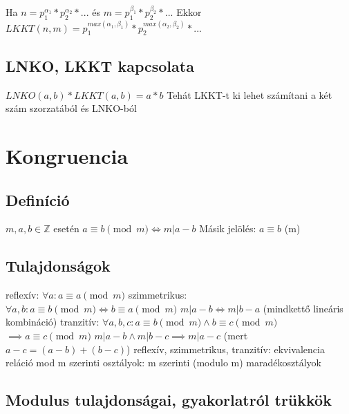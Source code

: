 \documentclass[12pt,a4paper]{article}
\begin{document}
\begin{outline}
	\1 Ha $n=p_1^{\alpha_1}*p_2^{\alpha_2}*...$ és $m=p_1^{\beta_1}*p_2^{\beta_2}*...$
	\1 Ekkor $LKKT(n,m) = p_1^{max(\alpha_1,\beta_1)}*p_2^{max(\alpha_2,\beta_2)}*...$
\end{outline}

\subsection{LNKO, LKKT kapcsolata}

\begin{outline}
	\1 $LNKO(a,b)*LKKT(a,b)=a*b$
	\1 Tehát LKKT-t ki lehet számítani a két szám szorzatából és LNKO-ból
\end{outline}

\pagebreak

\section{Kongruencia}

\subsection{Definíció}

\begin{outline}
	\1 $m,a,b \in \mathbb{Z}$ esetén $a \equiv b \pmod m \Leftrightarrow m|a-b$
	\1 Másik jelölés: $a \equiv b$ (m)
\end{outline}

\subsection{Tulajdonságok}

\begin{outline}
	\1 reflexív: $\forall a: a \equiv a \pmod m$
	\1 szimmetrikus: $\forall a,b: a \equiv b \pmod m \Leftrightarrow b \equiv a \pmod m$
		\2 $m|a-b \Leftrightarrow m|b-a$ (mindkettő lineáris kombináció)
	\1 tranzitív: $\forall a,b,c: a \equiv b \pmod m \wedge b \equiv c \pmod m$\\
	$\implies a \equiv c \pmod m$
		\2 $m|a-b \wedge m|b-c \implies m|a-c$ (mert $a-c=(a-b)+(b-c)$)
	\1 reflexív, szimmetrikus, tranzitív: ekvivalencia reláció
		\2 mod m szerinti osztályok: m szerinti (modulo m) maradékosztályok
\end{outline}

\pagebreak

\subsection{Modulus tulajdonságai, gyakorlatról trükkök}
\end{document}
